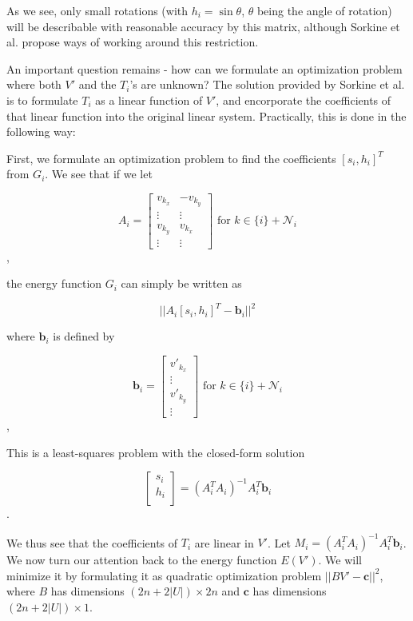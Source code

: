 \documentclass[english]{article}
\begin{document}
As we see, only small rotations (with $h_i = \sin \theta$, $\theta$ being the angle of rotation) will be describable with reasonable accuracy by this matrix, although Sorkine et al. propose ways of working around this restriction.

An important question remains - how can we formulate an optimization problem where both $V'$ and the $T_i$'s are unknown? The solution provided by Sorkine et al. is to formulate $T_i$ as a linear function of $V'$, and encorporate the coefficients of that linear function into the original linear system. Practically, this is done in the following way:

First, we formulate an optimization problem to find the coefficients $[s_i, h_i]^T$ from $G_i$. We see that if we let

\[
A_i = \begin{bmatrix}
  v_{k_x} & -v_{k_y} \\
  \vdots &  \vdots \\
  v_{k_y} &  v_{k_x} \\
  \vdots &  \vdots
\end{bmatrix}
\text{ for } k \in \{i\} + \mathcal{N}_i
\],

the energy function $G_i$ can simply be written as

\[
||A_i[s_i, h_i]^T - \mathbf{b}_i||^2
\]

where $\mathbf{b}_i$ is defined by

\[
\mathbf{b}_i = \begin{bmatrix}
  v'_{k_x} \\
  \vdots \\
  v'_{k_y} \\
  \vdots
\end{bmatrix}
\text{ for } k \in \{i\} + \mathcal{N}_i
\],

This is a least-squares problem with the closed-form solution

\[
\begin{bmatrix}
  s_i \\
  h_i \\
\end{bmatrix}
= (A_i^TA_i)^{-1}A_i^T\mathbf{b}_i
\].

We thus see that the coefficients of $T_i$ are linear in $V'$. Let $M_i = (A_i^TA_i)^{-1}A_i^T\mathbf{b}_i$. We now turn our attention back to the energy function $E(V')$. We will minimize it by formulating it as quadratic optimization problem $||BV' - \mathbf{c}||^2$, where $B$ has dimensions $(2n + 2|U|) \times 2n$ and $\mathbf{c}$ has dimensions $(2n + 2|U|) \times 1$.
\end{document}
